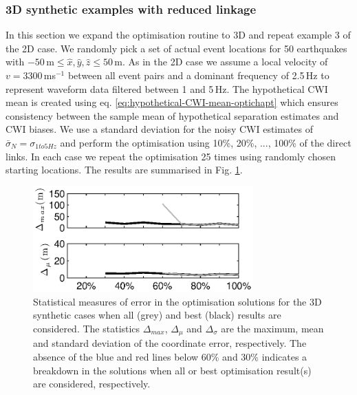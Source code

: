 \documentclass[extra]{gji}
\begin{document}
\subsubsection{3D synthetic examples with reduced linkage}

In this section we expand the optimisation routine to 3D and repeat example 3 of the 2D case.
We randomly pick a set of actual event locations for 50 earthquakes with
$-50$\,m$\leq \hat{x},\hat{y},\hat{z} \leq 50$\,m. As in the 2D case we assume a local velocity
of $v=3300\,$ms$^{-1}$ between all event pairs and a dominant frequency of 2.5$\,$Hz to represent
 waveform data filtered between 1 and 5$\,$Hz.
The hypothetical CWI mean is created using eq. \ref{eq:hypothetical-CWI-mean-optichapt}
which ensures consistency between the sample mean of hypothetical separation estimates and CWI
biases. We use a standard deviation for the noisy CWI estimates
of $\bar{\sigma}_N = \sigma_{1to5Hz}$ and perform the optimisation using 10\%,
20\%, ..., 100\% of the direct links.
In each case we repeat the
optimisation 25 times using randomly chosen starting locations. The results are
summarised in Fig. \ref{fig:optimisationresults-3Dsynth}.

\begin{figure}
\noindent\includegraphics[width = 20pc]{diags/synth3Dmulti/ressummary_3Dsynth50eq.eps}
\caption{Statistical measures of error in the optimisation solutions for the 3D synthetic cases when all (grey)
and best (black) results are considered. The statistics $\Delta_{max}$, $\Delta_\mu$ and
$\Delta_\sigma$ are the maximum, mean and standard deviation of the coordinate error, respectively.
The absence of the blue and red lines below 60\% and 30\% indicates a breakdown in the solutions
when all or best optimisation result(s) are considered, respectively.}
\label{fig:optimisationresults-3Dsynth}
\end{figure}
\end{document}
